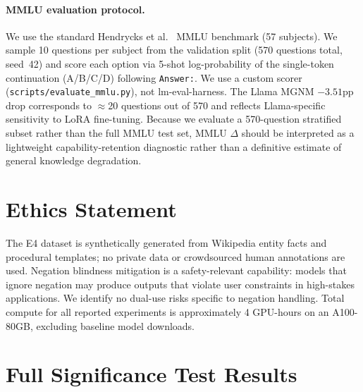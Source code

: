 \documentclass[letterpaper]{article}
\begin{document}
\paragraph{MMLU evaluation protocol.}
We use the standard Hendrycks et al.~\cite{hendrycks2020measuring} MMLU benchmark
(57 subjects). We sample 10 questions per subject from the validation split
(570 questions total, seed~42) and score each option via 5-shot log-probability
of the single-token continuation (A/B/C/D) following \texttt{Answer:}.
We use a custom scorer (\texttt{scripts/evaluate\_mmlu.py}), not lm-eval-harness.
The Llama MGNM $-3.51$pp drop corresponds to $\approx$20 questions out of 570
and reflects Llama-specific sensitivity to LoRA fine-tuning.
Because we evaluate a 570-question stratified subset rather than the full
MMLU test set, MMLU $\Delta$ should be interpreted as a lightweight
capability-retention diagnostic rather than a definitive estimate of
general knowledge degradation.

\section{Ethics Statement}

The E4 dataset is synthetically generated from Wikipedia entity facts and
procedural templates; no private data or crowdsourced human annotations are used.
Negation blindness mitigation is a safety-relevant capability: models that
ignore negation may produce outputs that violate user constraints in
high-stakes applications.
We identify no dual-use risks specific to negation handling.
Total compute for all reported experiments is approximately 4 GPU-hours on
an A100-80GB, excluding baseline model downloads.

\section{Full Significance Test Results}
\end{document}
